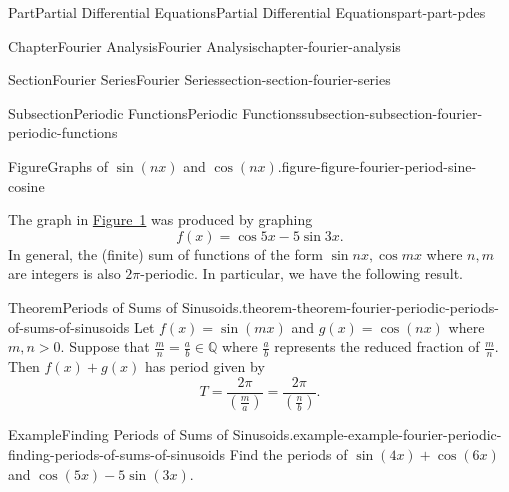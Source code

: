 \documentclass[twoside,10pt,]{book}
\numberwithin{equation}{part}
\newcommand{\QQ}{\mathbb{Q}}
\begin{document}
\begin{partptx}{Part}{Partial Differential Equations}{}{Partial Differential Equations}{}{}{part-part-pdes}
\begin{chapterptx}{Chapter}{Fourier Analysis}{}{Fourier Analysis}{}{}{chapter-fourier-analysis}
\begin{sectionptx}{Section}{Fourier Series}{}{Fourier Series}{}{}{section-section-fourier-series}
\begin{subsectionptx}{Subsection}{Periodic Functions}{}{Periodic Functions}{}{}{subsection-subsection-fourier-periodic-functions}
  \begin{figureptx}{Figure}{Graphs of \(\sin(nx)\) and \(\cos(nx)\).}{figure-figure-fourier-period-sine-cosine}{}%
\begin{image}{0.2}{0.6}{0.2}{}%
%
\end{image}%
\tcblower
\end{figureptx}%
The graph in \hyperref[figure-figure-fourier-periodic-function]{Figure~1} was produced by graphing%
\begin{equation*}
f(x) = \cos5x-5\sin3x.
\end{equation*}
In general, the (finite) sum of functions of the form \(\sin nx,\cos mx\) where \(n,m\) are integers is also \(2\pi\)-periodic. In particular, we have the following result.%
\begin{theorem}{Theorem}{Periods of Sums of Sinusoids.}{}{theorem-theorem-fourier-periodic-periods-of-sums-of-sinusoids}%
Let \(f(x) = \sin(mx)\) and \(g(x) = \cos(nx)\) where \(m,n > 0\). Suppose that \(\frac{m}{n} = \frac{a}{b}\in\QQ\) where \(\frac{a}{b}\) represents the reduced fraction of \(\frac{m}{n}\). Then \(f(x) + g(x)\) has period given by%
\begin{equation*}
T = \frac{2\pi}{(\frac{m}{a})} = \frac{2\pi}{(\frac{n}{b})}\text{.}
\end{equation*}
%
\end{theorem}
\begin{example}{Example}{Finding Periods of Sums of Sinusoids.}{example-example-fourier-periodic-finding-periods-of-sums-of-sinusoids}%
Find the periods of \(\sin(4x) + \cos(6x)\) and \(\cos(5x)-5\sin(3x)\).%
\par\smallskip%

\end{example}
\end{subsectionptx}
\end{sectionptx}
\end{chapterptx}
\end{partptx}
\end{document}
